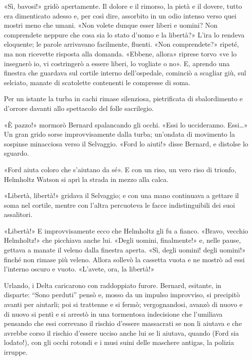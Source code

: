 \documentclass[
a5paper, %
10pt, %
twoside, 
onecolumn, %
openany, %
]{memoir}
\begin{document}
«Sì, bavosi!» gridò apertamente. Il dolore e il rimorso, la pietà e il dovere, tutto era dimenticato adesso e, per così dire, assorbito in un odio intenso verso quei mostri meno che umani. «Non volete dunque esser liberi e uomini? Non comprendete neppure che cosa sia lo stato d’uomo e la libertà?» L’ira lo rendeva eloquente; le parole arrivavano facilmente, fluenti. «Non comprendete?» ripeté, ma non ricevette risposta alla domanda. «Ebbene, allora» riprese torvo «ve lo insegnerò io, vi costringerò a essere liberi, lo vogliate o no». E, aprendo una finestra che guardava sul cortile interno dell’ospedale, cominciò a scagliar giù, sul selciato, manate di scatolette contenenti le compresse di soma.

Per un istante la turba in cachi rimase silenziosa, pietrificata di sbalordimento e d’orrore davanti allo spettacolo del folle sacrilegio.

«È pazzo!» mormorò Bernard spalancando gli occhi. «Essi lo uccideranno. Essi…» Un gran grido sorse improvvisamente dalla turba; un’ondata di movimento la sospinse minacciosa verso il Selvaggio. «Ford lo aiuti!» disse Bernard, e distolse lo sguardo.

«Ford aiuta coloro che s’aiutano da sé». E con un riso, un vero riso di trionfo, Helmholtz Watson si aprì la strada in mezzo alla calca.

«Libertà, libertà!» gridava il Selvaggio; e con una mano continuava a gettare il soma nel cortile, mentre con l’altra percuoteva le facce indistinguibili dei suoi assalitori.

«Libertà!» E improvvisamente ecco che Helmholtz gli fu a fianco. «Bravo, vecchio Helmholtz!» che picchiava anche lui. «Degli uomini, finalmente!» e, nelle pause, gettava a manate il veleno dalla finestra aperta. «Sì, degli uomini! degli uomini!» finché non rimase più veleno. Allora sollevò la cassetta vuota e ne mostrò ad essi l’interno oscuro e vuoto. «L’avete, ora, la libertà!»

Urlando, i Delta caricarono con raddoppiato furore. Bernard, esitante, in disparte: “Sono perduti” pensò e, mosso da un impulso improvviso, si precipitò avanti per aiutarli; poi si trattenne e si fermò; vergognandosi, avanzò di nuovo e di nuovo si pentì e si arrestò in una tormentosa indecisione che l’umiliava pensando che essi correvano il rischio d’essere massacrati se non li aiutava e che avrebbe corso il rischio d’essere ucciso anche lui se li aiutava, quando (Ford sia lodato!), con gli occhi rotondi e i musi suini delle maschere antigas, la polizia irruppe.
\end{document}

